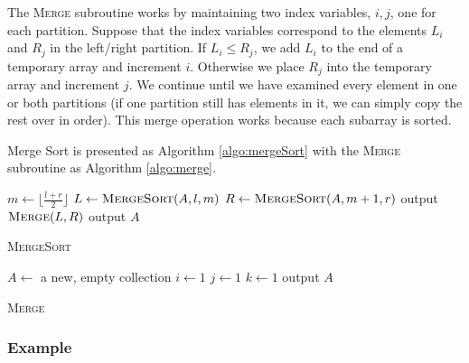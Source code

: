 The \textsc{Merge} subroutine works by maintaining two index variables, 
$i, j$, one for each partition.  Suppose that the index variables 
correspond to the elements $L_i$ and $R_j$ in the left/right partition.
If $L_i \leq R_j$, we add $L_i$ to the end of a temporary array and
increment $i$.  Otherwise we place $R_j$ into the temporary array
and increment $j$.  We continue until we have examined every element
in one or both partitions (if one partition still has elements in it, 
we can simply copy the rest over in order).  This merge operation works
because each subarray is sorted.

Merge Sort is presented as Algorithm \ref{algo:mergeSort} with the
\textsc{Merge} subroutine as Algorithm \ref{algo:merge}.

\begin{algorithm}
   {
    $m \leftarrow \lfloor\frac{l+r}{2}\rfloor$ \;
    $L \leftarrow \textsc{MergeSort}(A, l, m)$ \;
    $R \leftarrow \textsc{MergeSort}(A, m+1, r)$ \;
    output $\textsc{Merge}(L, R)$ \;    
  }{
    output $A$ \;
  }
\caption{\textsc{MergeSort}}
\label{algo:mergeSort}
\end{algorithm}

\begin{algorithm}[H]
  $A \leftarrow $ a new, empty collection \;
  $i \leftarrow 1$ \;
  $j \leftarrow 1$ \;
  $k \leftarrow 1$  \;
  output $A$ \;
\caption{\textsc{Merge}}
\label{algo:merge}
\end{algorithm}

\subsubsection{Example}

